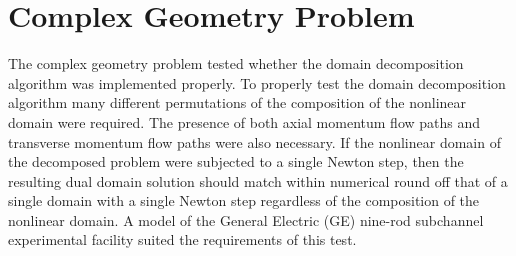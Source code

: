 %
%
%
%
%

\FloatBarrier
\section{Complex Geometry Problem}
\label{sect:complexProblem}
The complex geometry problem tested whether the domain decomposition algorithm was implemented properly.
To properly test the domain decomposition algorithm many different permutations of the composition of the nonlinear domain were required.
The presence of both axial momentum flow paths and transverse momentum flow paths were also necessary.
If the nonlinear domain of the decomposed problem were subjected to a single Newton step, then the resulting dual domain solution should match within numerical round off that of a single domain with a single Newton step regardless of the composition of the nonlinear domain.
A model of the General Electric (GE) nine-rod subchannel experimental facility \cite{Lahey1970} suited the requirements of this test.

